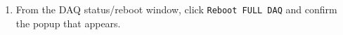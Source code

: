 \documentclass[letter,12pt]{article}
\begin{document}
\begin{enumerate}
\item 
\begin{minipage}[t]{0.35\textwidth}
From the DAQ status/reboot window, click \texttt{Reboot FULL DAQ} and confirm the popup that appears.
\end{minipage}
\hspace*{0.0\textwidth}
\begin{minipage}[t]{0.15\textwidth}
\end{minipage}
\begin{minipage}[t]{0.15\textwidth}

\end{minipage}
\end{enumerate}
\end{document}
